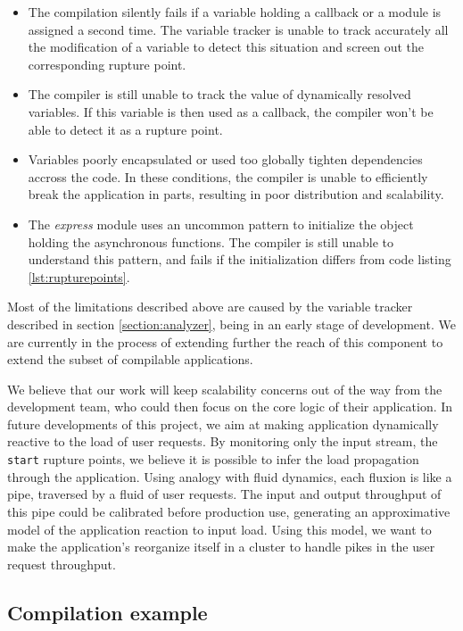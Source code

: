 \begin{itemize}
  \item The compilation silently fails if a variable holding a callback or a module is assigned a second time.
        The variable tracker is unable to track accurately all the modification of a variable to detect this situation and screen out the corresponding rupture point.
  \item The compiler is still unable to track the value of dynamically resolved variables.
        If this variable is then used as a callback, the compiler won't be able to detect it as a rupture point.
  \item Variables poorly encapsulated or used too globally tighten dependencies accross the code.
        In these conditions, the compiler is unable to efficiently break the application in parts, resulting in poor distribution and scalability.
  \item The \textit{express} module uses an uncommon pattern to initialize the object holding the asynchronous functions.
        The compiler is still unable to understand this pattern, and fails if the initialization differs from code listing \ref{lst:rupturepoints}.
\end{itemize}

Most of the limitations described above are caused by the variable tracker described in section \ref{section:analyzer}, being in an early stage of development.
We are currently in the process of extending further the reach of this component to extend the subset of compilable applications.

We believe that our work will keep scalability concerns out of the way from the development team, who could then focus on the core logic of their application.
In future developments of this project, we aim at making application dynamically reactive to the load of user requests.
By monitoring only the input stream, the \texttt{start} rupture points, we believe it is possible to infer the load propagation through the application.
Using analogy with fluid dynamics, each fluxion is like a pipe, traversed by a fluid of user requests.
The input and output throughput of this pipe could be calibrated before production use, generating an approximative model of the application reaction to input load.
Using this model, we want to make the application's reorganize itself in a cluster to handle pikes in the user request throughput.

\subsection{Compilation example}

